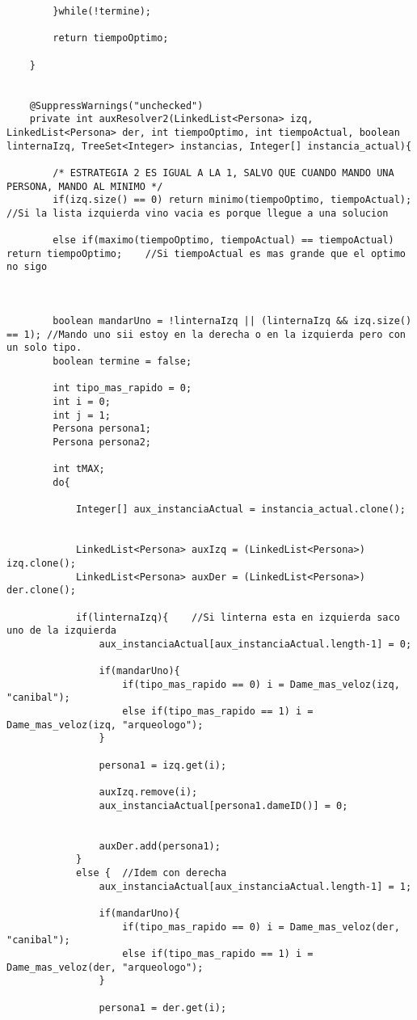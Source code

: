 \begin{lstlisting}
		}while(!termine);
		
		return tiempoOptimo;

	}

	
	@SuppressWarnings("unchecked")
	private int auxResolver2(LinkedList<Persona> izq, LinkedList<Persona> der, int tiempoOptimo, int tiempoActual, boolean linternaIzq, TreeSet<Integer> instancias, Integer[] instancia_actual){
		
		/* ESTRATEGIA 2 ES IGUAL A LA 1, SALVO QUE CUANDO MANDO UNA PERSONA, MANDO AL MINIMO */
		if(izq.size() == 0) return minimo(tiempoOptimo, tiempoActual);	//Si la lista izquierda vino vacia es porque llegue a una solucion 

		else if(maximo(tiempoOptimo, tiempoActual) == tiempoActual) return tiempoOptimo;	//Si tiempoActual es mas grande que el optimo no sigo
		
		
		
		boolean mandarUno = !linternaIzq || (linternaIzq && izq.size() == 1); //Mando uno sii estoy en la derecha o en la izquierda pero con un solo tipo.
		boolean termine = false;

		int tipo_mas_rapido = 0;
		int i = 0;
		int j = 1;
		Persona persona1;
		Persona persona2;

		int tMAX;
		do{
			
			Integer[] aux_instanciaActual = instancia_actual.clone();					
			
			
			LinkedList<Persona> auxIzq = (LinkedList<Persona>) izq.clone();
			LinkedList<Persona> auxDer = (LinkedList<Persona>) der.clone();

			if(linternaIzq){	//Si linterna esta en izquierda saco uno de la izquierda
				aux_instanciaActual[aux_instanciaActual.length-1] = 0;
				
				if(mandarUno){
					if(tipo_mas_rapido == 0) i = Dame_mas_veloz(izq, "canibal");
					else if(tipo_mas_rapido == 1) i = Dame_mas_veloz(izq, "arqueologo");
				}
				
				persona1 = izq.get(i);

				auxIzq.remove(i);
				aux_instanciaActual[persona1.dameID()] = 0;
				
				
				auxDer.add(persona1);
			}
			else { 	//Idem con derecha
				aux_instanciaActual[aux_instanciaActual.length-1] = 1;
				
				if(mandarUno){
					if(tipo_mas_rapido == 0) i = Dame_mas_veloz(der, "canibal");
					else if(tipo_mas_rapido == 1) i = Dame_mas_veloz(der, "arqueologo");
				}
				
				persona1 = der.get(i);


\end{lstlisting}
